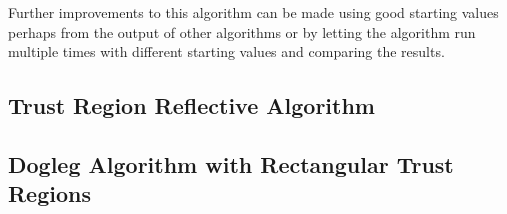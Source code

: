 Further improvements to this algorithm can be made using good starting values perhaps from the output of other algorithms or by letting the algorithm run multiple times with different starting values and comparing the results.

\subsection{Trust Region Reflective Algorithm}


\subsection{Dogleg Algorithm with Rectangular Trust Regions}
